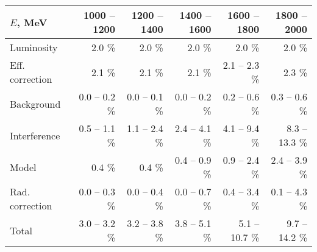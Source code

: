 \begin{tabular}{lrrrrr}
$E$, MeV & 1000 -- 1200 & 1200 -- 1400 & 1400 -- 1600 & 1600 -- 1800 & 1800 -- 2000 \\\hline
Luminosity & 2.0 \% & 2.0 \% & 2.0 \% & 2.0 \% & 2.0 \% \\
Eff. correction & 2.1 \% & 2.1 \% & 2.1 \% & 2.1 -- 2.3 \% & 2.3 \% \\
Background & 0.0 -- 0.2 \% & 0.0 -- 0.1 \% & 0.0 -- 0.2 \% & 0.2 -- 0.6 \% & 0.3 -- 0.6 \% \\
Interference & 0.5 -- 1.1 \% & 1.1 -- 2.4 \% & 2.4 -- 4.1 \% & 4.1 -- 9.4 \% & 8.3 -- 13.3 \% \\
Model & 0.4 \% & 0.4 \% & 0.4 -- 0.9 \% & 0.9 -- 2.4 \% & 2.4 -- 3.9 \% \\
Rad. correction & 0.0 -- 0.3 \% & 0.0 -- 0.4 \% & 0.0 -- 0.7 \% & 0.4 -- 3.4 \% & 0.1 -- 4.3 \% \\\hline
Total & 3.0 -- 3.2 \% & 3.2 -- 3.8 \% & 3.8 -- 5.1 \% & 5.1 -- 10.7 \% & 9.7 -- 14.2 \% \\
\end{tabular}
